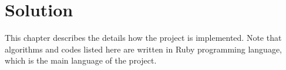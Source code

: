 \chapter{Solution}
\label{ch:solution}

This chapter describes the details how the project is implemented.
Note that algorithms and codes listed here are written in Ruby programming language,
which is the main language of the project.
